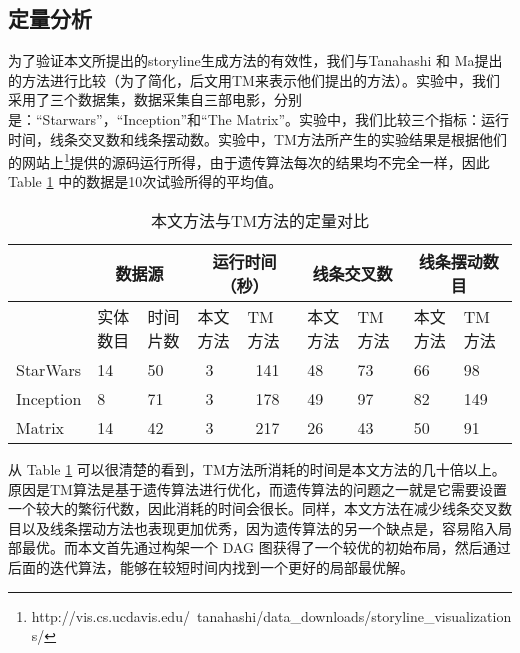 \subsection{定量分析}
为了验证本文所提出的storyline生成方法的有效性，我们与Tanahashi 和 Ma\cite{tanahashi2012design}提出的方法进行比较（为了简化，后文用TM来表示他们提出的方法）。实验中，我们采用了三个数据集，数据采集自三部电影，分别是：“Starwars”，“Inception”和“The Matrix”。实验中，我们比较三个指标：运行时间，线条交叉数和线条摆动数。实验中，TM方法所产生的实验结果是根据他们的网站上\footnote{http://vis.cs.ucdavis.edu/~tanahashi/data\_downloads/storyline\_visualizations/}提供的源码运行所得，由于遗传算法每次的结果均不完全一样，因此 Table \ref{table:quantitative-analysis} 中的数据是10次试验所得的平均值。
\begin{table}[htb]
\caption{本文方法与TM方法的定量对比}
\label{table:quantitative-analysis}
\begin{center}
  \begin{tabular}{|*{9}{l |}}\hline
                    & \multicolumn{2}{c|}{数据源} & \multicolumn{2}{c|}{运行时间（秒）} & \multicolumn{2}{c|}{线条交叉数} & \multicolumn{2}{c|}{线条摆动数目} \\ \hline
                    & 实体数目 &  时间片数 & 本文方法 & TM 方法 & 本文方法 & TM 方法 & 本文方法 & TM 方法 \\ \hline
    StarWars & 14           & 50             & ~3           & ~141       &  48          &  73        &  66           & 98         \\ \hline
    Inception &  8            & 71             & ~3           & ~178       &  49          &  97         &  82           & 149        \\ \hline
    Matrix      & 14           & 42             & ~3           & ~217       &  26          &  43         &  50           & 91          \\ \hline
  \end{tabular}
\end{center}
\end{table}

从 Table \ref{table:quantitative-analysis} 可以很清楚的看到，TM方法所消耗的时间是本文方法的几十倍以上。原因是TM算法是基于遗传算法进行优化，而遗传算法的问题之一就是它需要设置一个较大的繁衍代数，因此消耗的时间会很长。同样，本文方法在减少线条交叉数目以及线条摆动方法也表现更加优秀，因为遗传算法的另一个缺点是，容易陷入局部最优。而本文首先通过构架一个 DAG 图获得了一个较优的初始布局，然后通过后面的迭代算法，能够在较短时间内找到一个更好的局部最优解。

